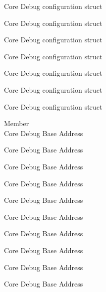 \begin{DoxyRefList}
\label{deprecated__deprecated000813}%
%
Core Debug configuration struct 

\label{deprecated__deprecated000889}%
%
Core Debug configuration struct 

\label{deprecated__deprecated000952}%
%
Core Debug configuration struct 

\label{deprecated__deprecated001031}%
%
Core Debug configuration struct 

\label{deprecated__deprecated001107}%
%
Core Debug configuration struct 

\label{deprecated__deprecated001210}%
%
Core Debug configuration struct 

\label{deprecated__deprecated001312}%
%
Core Debug configuration struct  
\item[Member \doxylink{group___c_m_s_i_s___core_debug_ga680604dbcda9e9b31a1639fcffe5230b}{Core\+Debug\+\_\+\+BASE} ]\hfill \\
\label{deprecated__deprecated000099}%
%
Core Debug Base Address 

\label{deprecated__deprecated000153}%
%
Core Debug Base Address 

\label{deprecated__deprecated000229}%
%
Core Debug Base Address 

\label{deprecated__deprecated000292}%
%
Core Debug Base Address 

\label{deprecated__deprecated000371}%
%
Core Debug Base Address 

\label{deprecated__deprecated000447}%
%
Core Debug Base Address 

\label{deprecated__deprecated000550}%
%
Core Debug Base Address 

\label{deprecated__deprecated000652}%
%
Core Debug Base Address 

\label{deprecated__deprecated000758}%
%
Core Debug Base Address 

\label{deprecated__deprecated000812}%
%
Core Debug Base Address 


\end{DoxyRefList}
